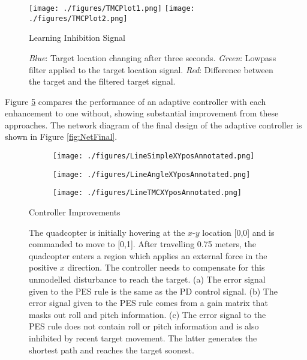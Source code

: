 \documentclass[letterpaper, 10 pt, conference]{ieeeconf}  %
\begin{document}
\begin{figure}
\centering
\texttt{[image: ./figures/TMCPlot1.png]}
\texttt{[image: ./figures/TMCPlot2.png]}
\caption{Learning Inhibition Signal}
\label{fig:TMCSignal}
\captionsetup{singlelinecheck=off,font=footnotesize}
\caption*{\textit{Blue}: Target location changing after three seconds. \textit{Green}: Lowpass filter applied to the target location signal. \textit{Red}: Difference between the target and the filtered target signal.}
\end{figure}

Figure \ref{fig:ImprovementComparison} compares the performance of an adaptive controller with each enhancement to one without, showing substantial improvement from these approaches.
The network diagram of the final design of the adaptive controller is shown in Figure \ref{fig:NetFinal}.

\begin{figure}
\centering
\begin{subfigure}[t]{0.15\textwidth}
\texttt{[image: ./figures/LineSimpleXYposAnnotated.png]}
\caption{}
\label{fig:ImprovementComparisonA}
\end{subfigure}
\begin{subfigure}[t]{0.15\textwidth}
\texttt{[image: ./figures/LineAngleXYposAnnotated.png]}
\caption{}
\label{fig:ImprovementComparisonB}
\end{subfigure}
\begin{subfigure}[t]{0.15\textwidth}
\texttt{[image: ./figures/LineTMCXYposAnnotated.png]}
\caption{}
\label{fig:ImprovementComparisonC}
\end{subfigure}
\caption{Controller Improvements}
\label{fig:ImprovementComparison}
\captionsetup{singlelinecheck=off,font=footnotesize}
\caption*{The quadcopter is initially hovering at the $x$-$y$ location [0,0] and is commanded to move to [0,1]. After travelling 0.75 meters, the quadcopter enters a region which applies an external force in the positive $x$ direction. The controller needs to compensate for this unmodelled disturbance to reach the target. (a) The error signal given to the PES rule is the same as the PD control signal. (b) The error signal given to the PES rule comes from a gain matrix that masks out roll and pitch information. (c) The error signal to the PES rule does not contain roll or pitch information and is also inhibited by recent target movement. The latter generates the shortest path and reaches the target soonest.}
\end{figure}
\end{document}
